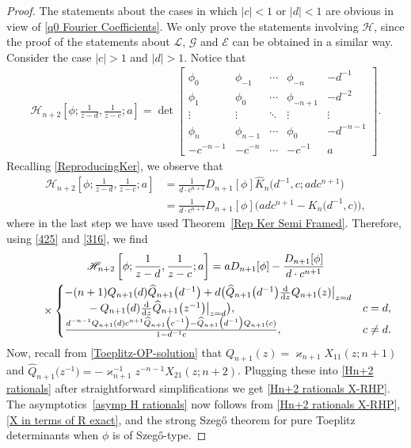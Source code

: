 \documentclass[pdftex]{sigma}
\numberwithin{equation}{section}
\newcommand{\dd}{{\rm d}}
\begin{document}
		\begin{proof}
			The statements about the cases in which $|c|<1$ or $|d|<1$ are obvious in view of \eqref{q0 Fourier Coefficients}. We only prove the statements involving $\mathscr{H}$, since the proof of the statements about $\mathscr{L}$, $\mathscr{G}$ and $\mathscr{E}$ can be obtained in a similar way. Consider the case $|c|>1$ and $|d|>1$. Notice that
			\begin{gather*}
				\mathscr{H}_{n+2}\left[\phi;\frac{1}{z-d},\frac{1}{z-c};a\right] = \det \begin{bmatrix}
					\phi_0& \phi_{-1} & \cdots & \phi_{-n} & -d^{-1} \\
					\phi_{1}& \phi_0 & \cdots & \phi_{-n+1} & -d^{-2} \\
					\vdots & \vdots & \ddots & \vdots & \vdots \\
					\phi_{n} & \phi_{n-1} & \cdots & \phi_{0} & -d^{-n-1} \\
					-c^{-n-1} & -c^{-n} & \cdots & -c^{-1} & a
				\end{bmatrix}.
			\end{gather*}
			Recalling \eqref{ReproducingKer}, we observe that
			\begin{align*}
				\mathscr{H}_{n+2}\left[\phi;\frac{1}{z-d},\frac{1}{z-c};a\right] & = \frac{1}{d \cdot c^{n+1}} D_{n+1}[\phi] \widehat{K}_{n}\big(d^{-1},c;a d c^{n+1}\big) \\ & = \frac{1}{d \cdot c^{n+1}} D_{n+1}[\phi] \big( adc^{n+1} - K_{n}\big(d^{-1},c\big) \big),	
			\end{align*}
			where in the last step we have used Theorem~\ref{Rep Ker Semi Framed}. Therefore, using \eqref{425} and \eqref{316}, we find
			\begin{gather}
					\mathscr{H}_{n+2}\left[\phi;\frac{1}{z-d},\frac{1}{z-c};a\right]
= aD_{n+1}[\phi] - \frac{D_{n+1}[\phi]}{d \cdot c^{n+1}}\nonumber \\
\phantom{\qquad}{}\times \begin{cases}
						-(n+1) Q_{n+1}(d)\widehat{Q}_{n+1}\big(d^{-1}\big)+ d \big( \widehat{Q}_{n+1}\big(d^{-1}\big) \tfrac{\dd}{\dd z} Q_{n+1}(z) \big|_{z=d} & \\
\qquad{} - Q_{n+1}(d) \tfrac{\dd}{\dd z} \widehat{Q}_{n+1}\big(z^{-1}\big) \big|_{z=d} \big), & c = d, \\
						 \tfrac{d^{-n-1}Q_{n+1}(d)c^{n+1}\widehat{Q}_{n+1}\big(c^{-1}\big) - \widehat{Q}_{n+1}\big(d^{-1}\big) Q_{n+1}(c)}{1-d^{-1}c}, & c \neq d.
					\end{cases}\label{Hn+2 rationals}
\end{gather}
Now, recall from \eqref{Toeplitz-OP-solution} that $Q_{n+1}(z)=\varkappa_{n+1} X_{11}(z;n+1)$ and $\widehat{Q}_{n+1}\big(z^{-1}\big) = - \varkappa^{-1}_{n+1} z^{-n-1} X_{21}(z;\allowbreak n+2)$.
 Plugging these into \eqref{Hn+2 rationals} after straightforward simplifications we get \eqref{Hn+2 rationals X-RHP}. The asymptotics~\eqref{asymp H rationals} now follows from \eqref{Hn+2 rationals X-RHP}, \eqref{X in terms of R exact}, and the strong Szeg\H{o} theorem for pure Toeplitz determinants when $\phi$ is of Szeg\H{o}-type.
		\end{proof}
\end{document}
